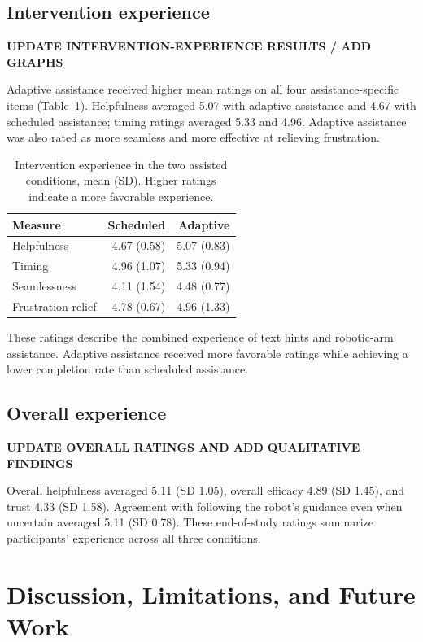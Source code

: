 \documentclass[sigconf]{aamas}
\begin{document}
\subsection{Intervention experience}

\textbf{UPDATE INTERVENTION-EXPERIENCE RESULTS / ADD GRAPHS}

Adaptive assistance received higher mean ratings on all four assistance-specific items (Table~\ref{tab:assistance}). Helpfulness averaged 5.07 with adaptive assistance and 4.67 with scheduled assistance; timing ratings averaged 5.33 and 4.96. Adaptive assistance was also rated as more seamless and more effective at relieving frustration.

\begin{table}[t]
\centering
\caption{Intervention experience in the two assisted conditions, mean (SD). Higher ratings indicate a more favorable experience.}
\label{tab:assistance}
\begin{tabular}{lrr}
\toprule
Measure & Scheduled & Adaptive \\
\midrule
Helpfulness & 4.67 (0.58) & 5.07 (0.83) \\
Timing & 4.96 (1.07) & 5.33 (0.94) \\
Seamlessness & 4.11 (1.54) & 4.48 (0.77) \\
Frustration relief & 4.78 (0.67) & 4.96 (1.33) \\
\bottomrule
\end{tabular}
\end{table}

These ratings describe the combined experience of text hints and robotic-arm assistance. Adaptive assistance received more favorable ratings while achieving a lower completion rate than scheduled assistance.

\subsection{Overall experience}

\textbf{UPDATE OVERALL RATINGS AND ADD QUALITATIVE FINDINGS}

Overall helpfulness averaged 5.11 (SD 1.05), overall efficacy 4.89 (SD 1.45), and trust 4.33 (SD 1.58). Agreement with following the robot's guidance even when uncertain averaged 5.11 (SD 0.78). These end-of-study ratings summarize participants' experience across all three conditions.

\section{Discussion, Limitations, and Future Work}
\end{document}
